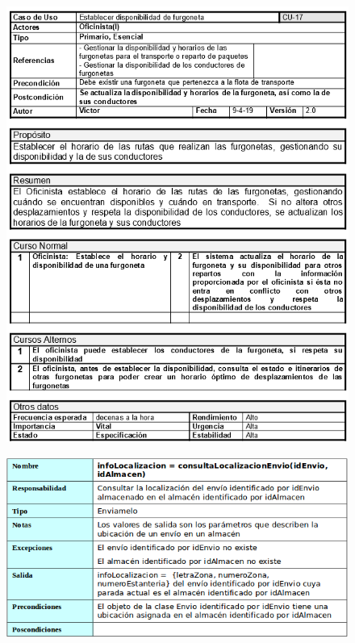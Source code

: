 \begin{figure}[H]
	\centering
	\includegraphics[width=16cm]{17}
\end{figure}
\begin{figure}[H]
	\centering
	\includegraphics[width=16cm]{18}
\end{figure}
\newpage
